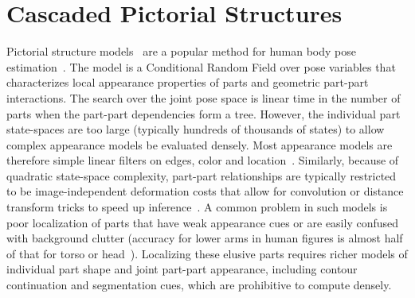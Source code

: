 \chapter{Cascaded Pictorial Structures}

Pictorial structure models~\cite{fischler1973ps} are a popular method for human body pose estimation~\cite{felz05,fergus2005sparse,devacrf,ferrari08,andriluka09}.
The model is a Conditional Random Field over pose variables that characterizes 
local appearance properties of parts and geometric part-part interactions.   
The search over the joint pose space is linear time in the number of parts when 
the part-part dependencies form a tree.  However,  the individual part 
state-spaces are too large (typically hundreds of thousands of states) to allow 
complex appearance models be evaluated densely.   Most appearance models are 
therefore simple linear filters on edges, color and 
location~\cite{felz05,devacrf,ferrari08,andriluka09}. Similarly, because of 
quadratic state-space complexity, part-part relationships are typically 
restricted to be image-independent deformation costs that allow for convolution 
or distance transform tricks to speed up inference~\cite{felz05}. A common 
problem in such models is poor localization of parts that have weak appearance 
cues or are easily confused with background clutter (accuracy for lower arms in 
human figures is almost half of that for torso or head~\cite{andriluka09}).   
Localizing these elusive parts requires richer models of individual part shape 
and joint part-part appearance, including contour continuation and segmentation 
cues, which are prohibitive to compute densely.

